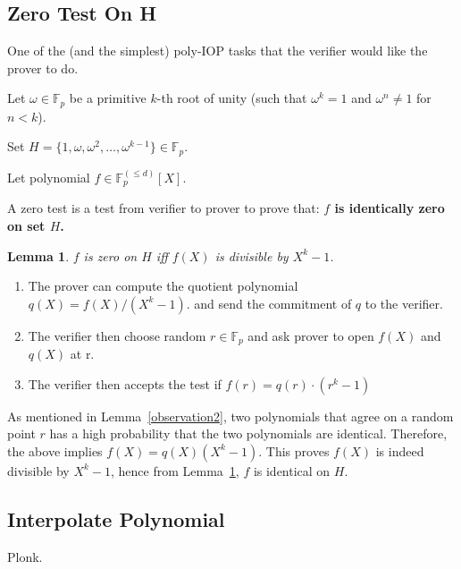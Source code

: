 \documentclass[10pt]{article}
\newtheorem{lemma}{Lemma}
\newcommand{\FFamily}{\mathbb{F}^{(\leq d)}_p[X]}
\newcommand{\FField}{\mathbb{F}_p}
\begin{document}
\subsection{Zero Test On H}
One of the (and the simplest) poly-IOP tasks that the verifier would like the
prover to do.

\begin{description}
\item Let $\omega \in \FField$ be a primitive $k$-th root of unity (such
    that $\omega^{k} = 1$ and  $\omega^n \neq 1$ for $n < k$).
\item Set $H = \{1, \omega, \omega^2, \ldots, \omega^{k-1}\} \in
    \FField$. 
\item Let polynomial $f \in \FFamily$.
\end{description}

A zero test is a test from verifier to prover to prove that: \textbf{$f$ is
identically zero on set $H$.}

\begin{lemma}\label{zero-test}
    $f$ is zero on $H$ iff $f(X)$ is divisible by $X^k - 1$.
\end{lemma}
\begin{enumerate}
    \item The prover can compute the quotient polynomial $q(X) = f(X) /
        (X^k - 1)$. and send the commitment of $q$ to the verifier.
    \item The verifier then choose random $r \in \FField$ and ask prover
        to open $f(X)$ and $q(X)$ at r.
    \item The verifier then accepts the test if $f(r) = q(r) \cdot (r^k - 1)$
\end{enumerate}
As mentioned in Lemma~\ref{observation2}, two polynomials that agree on a random point $r$
has a high probability that the two polynomials are identical. 
Therefore, the above implies $f(X) = q(X)(X^k - 1)$. This proves $f(X)$ is
indeed divisible by $X^k - 1$, hence from Lemma~\ref{zero-test}, $f$ is
identical on $H$.

\subsection{Interpolate Polynomial}
Plonk.
\end{document}

